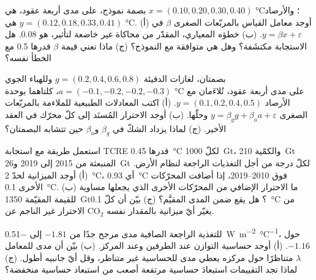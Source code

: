 \begin{exercise}[$\star\star$]\label{exo:b2:anthropogenic-climate-change:9}
بصمة نموذج، على مدى أربعة عقود، هي $x = (0.10, 0.20, 0.30, 0.40)$ \unit{\celsius}؛
والأرصاد هي $y = (0.12, 0.18, 0.33, 0.41)$ \unit{\celsius}. (أ) أوجد معامل القياس بالمربّعات الصغرى
$\beta$ في $y = \beta x + \varepsilon$. (ب) خطؤه المعياري، المقدّر من محاكاة
غير خاضعة لتأثير، هو \num{0.08}. هل الاستجابة مكتشَفة؟ وهل هي متوافقة مع النموذج؟ (ج) ماذا
تعني قيمة $\beta$ قدرها 0.5 مع الخطأ نفسه؟
\end{exercise}

\begin{exercise}[$\star\star\star$]\label{exo:b2:anthropogenic-climate-change:10}
بصمتان، لغازات الدفيئة $g = (0.2, 0.4, 0.6, 0.8)$ وللهباء الجوي $a = (-0.1, -0.2,
-0.2, -0.3)$، كلتاهما بوحدة \unit{\celsius} على مدى أربعة عقود، تُلاءَمان مع الأرصاد $y = (0.1,
0.2, 0.4, 0.5)$. (أ) اكتب المعادلات الطبيعية للملاءمة بالمربّعات الصغرى $y = \beta_g g + \beta_a a
+ \varepsilon$ وحلّها. (ب) أوجد الاحترار المُسنَد إلى كلّ محرّك في العقد الأخير.
(ج) لماذا يزداد الشكّ في $\beta_g$ و$\beta_a$ حين تتشابه البصمتان؟
\end{exercise}

\begin{exercise}[$\star\star\star$]\label{exo:b2:anthropogenic-climate-change:11}
استعمل طريقة  مع استجابة TCRE قدرها \qty{0.45}{\celsius} لكلّ
\qty{1000}{Gt}، والكمّية \qty{210}{Gt} المنبعثة من 2015 إلى 2019 و\qty{26}{Gt} لكلّ درجة من أجل
التغذيات الراجعة لنظام الأرض. (أ) أوجد الميزانية لحدّ \qty{2}{\celsius}، أي \qty{0.93}{\celsius} فوق
2010--2019، إذا أضافت المحرّكات الأخرى \qty{0.1}{\celsius}. (ب) ما الاحترار الإضافي من المحرّكات
الأخرى الذي يجعلها مساوية للقيمة المقيّمة \qty{1350}{Gt}؟ هل يقع ضمن المدى المقيَّم؟ (ج) بيّن
أن كلّ \qty{0.1}{\celsius} من الاحترار غير الناجم عن CO$_2$ يغيّر أيّ ميزانية بالمقدار نفسه.
\end{exercise}

\begin{exercise}[$\star\star\star$]\label{exo:b2:anthropogenic-climate-change:12}
للتغذية الراجعة الصافية مدى مرجح جدًا من $-1.81$ إلى \qty{-0.51}{W.m^{-2}.\celsius^{-1}}، حول
$-1.16$. (أ) أوجد حساسية التوازن عند الطرفين وعند المركز. (ب) بيّن أن مدى للمعامل $\lambda$
متناظرًا حول مركزه يعطي مدى للحساسية غير متناظر، وقل أيّ جانبيه أطول. (ج) لماذا
تجد التقييمات استبعادَ حساسية مرتفعة أصعب من استبعاد حساسية منخفضة؟
\end{exercise}


